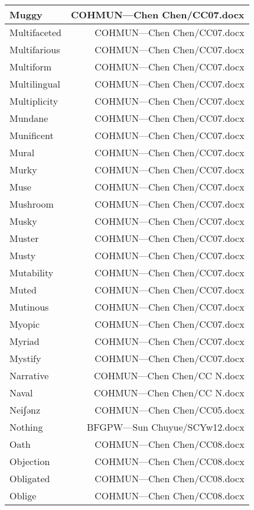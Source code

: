 \documentclass{article}
\begin{document}
\begin{center}
\begin{longtable}{|l|r|}
\hline
Muggy  &  COHMUN---Chen Chen/CC07.docx\\  
\hline
Multifaceted  &  COHMUN---Chen Chen/CC07.docx\\  
\hline
Multifarious  &  COHMUN---Chen Chen/CC07.docx\\  
\hline
Multiform  &  COHMUN---Chen Chen/CC07.docx\\  
\hline
Multilingual  &  COHMUN---Chen Chen/CC07.docx\\  
\hline
Multiplicity  &  COHMUN---Chen Chen/CC07.docx\\  
\hline
Mundane  &  COHMUN---Chen Chen/CC07.docx\\  
\hline
Munificent  &  COHMUN---Chen Chen/CC07.docx\\  
\hline
Mural  &  COHMUN---Chen Chen/CC07.docx\\  
\hline
Murky  &  COHMUN---Chen Chen/CC07.docx\\  
\hline
Muse  &  COHMUN---Chen Chen/CC07.docx\\  
\hline
Mushroom  &  COHMUN---Chen Chen/CC07.docx\\  
\hline
Musky  &  COHMUN---Chen Chen/CC07.docx\\  
\hline
Muster  &  COHMUN---Chen Chen/CC07.docx\\  
\hline
Musty  &  COHMUN---Chen Chen/CC07.docx\\  
\hline
Mutability  &  COHMUN---Chen Chen/CC07.docx\\  
\hline
Muted  &  COHMUN---Chen Chen/CC07.docx\\  
\hline
Mutinous  &  COHMUN---Chen Chen/CC07.docx\\  
\hline
Myopic  &  COHMUN---Chen Chen/CC07.docx\\  
\hline
Myriad  &  COHMUN---Chen Chen/CC07.docx\\  
\hline
Mystify  &  COHMUN---Chen Chen/CC07.docx\\  
\hline
Narrative  &  COHMUN---Chen Chen/CC N.docx\\  
\hline
Naval  &  COHMUN---Chen Chen/CC N.docx\\  
\hline
Neiʃənz  &  COHMUN---Chen Chen/CC05.docx\\  
\hline
Nothing  &  BFGPW---Sun Chuyue/SCYw12.docx\\  
\hline
Oath  &  COHMUN---Chen Chen/CC08.docx\\  
\hline
Objection  &  COHMUN---Chen Chen/CC08.docx\\  
\hline
Obligated  &  COHMUN---Chen Chen/CC08.docx\\  
\hline
Oblige  &  COHMUN---Chen Chen/CC08.docx\\  

\end{longtable}
\end{center}
\end{document}

